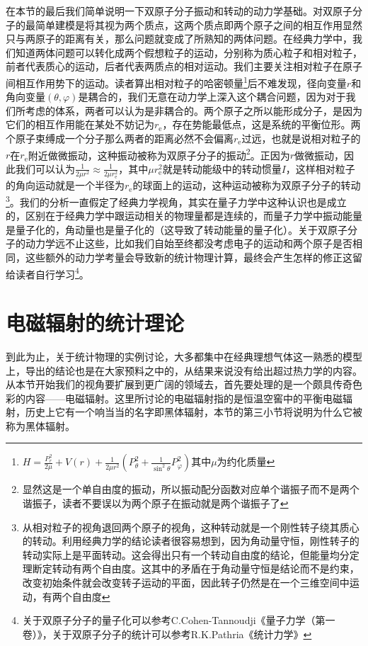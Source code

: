 \documentclass[../../main.tex]{subfiles}
\begin{document}
在本节的最后我们简单说明一下双原子分子振动和转动的动力学基础。对双原子分子的最简单建模是将其视为两个质点，这两个质点即两个原子之间的相互作用显然只与两原子的距离有关，那么问题就变成了所熟知的两体问题。在经典力学中，我们知道两体问题可以转化成两个假想粒子的运动，分别称为质心粒子和相对粒子，前者代表质心的运动，后者代表两质点的相对运动。我们主要关注相对粒子在原子间相互作用势下的运动。读者算出相对粒子的哈密顿量\footnote{\(H=\frac{P_r^2}{2\mu}+V(r)+\frac{1}{2\mu r^2}\left(P_{\theta}^2+\frac{1}{\sin^2\theta}P_{\varphi}^2\right)\)其中\(\mu\)为约化质量}后不难发现，径向变量\(r\)和角向变量\((\theta,\varphi)\)是耦合的，我们无意在动力学上深入这个耦合问题，因为对于我们所考虑的体系，两者可以认为是非耦合的。两个原子之所以能形成分子，是因为它们的相互作用能在某处不妨记为\(r_{\mathrm{e}}\)，存在势能最低点，这是系统的平衡位形。两个原子束缚成一个分子那么两者的距离必然不会偏离\(r_{\mathrm{e}}\)过远，也就是说相对粒子的\(r\)在\(r_{\mathrm{e}}\)附近做微振动，这种振动被称为双原子分子的振动\footnote{显然这是一个单自由度的振动，所以振动配分函数对应单个谐振子而不是两个谐振子，读者不要误以为两个原子在振动就是两个谐振子了}。正因为\(r\)做微振动，因此我们可以认为\(\frac{1}{2\mu r^2}\approx\frac{1}{2\mu r_{\mathrm{e}}^2}\)，其中\(\mu r_{\mathrm{e}}^2\)就是转动能级中的转动惯量\(I\)，这样相对粒子的角向运动就是一个半径为\(r_{\mathrm{e}}\)的球面上的运动，这种运动被称为双原子分子的转动\footnote{从相对粒子的视角退回两个原子的视角，这种转动就是一个刚性转子绕其质心的转动。利用经典力学的结论读者很容易想到，因为角动量守恒，刚性转子的转动实际上是平面转动。这会得出只有一个转动自由度的结论，但能量均分定理断定转动有两个自由度。这其中的矛盾在于角动量守恒是结论而不是约束，改变初始条件就会改变转子运动的平面，因此转子仍然是在一个三维空间中运动，有两个自由度}。我们的分析一直假定了经典力学视角，其实在量子力学中这种认识也是成立的，区别在于经典力学中跟运动相关的物理量都是连续的，而量子力学中振动能量是量子化的，角动量也是量子化的（这导致了转动能量的量子化）。关于双原子分子的动力学远不止这些，比如我们自始至终都没考虑电子的运动和两个原子是否相同，这些额外的动力学考量会导致新的统计物理计算，最终会产生怎样的修正这留给读者自行学习\footnote{关于双原子分子的量子化可以参考C.Cohen-Tannoudji《量子力学（第一卷）》，关于双原子分子的统计可以参考R.K.Pathria《统计力学》}。

\section{电磁辐射的统计理论}\label{sec:电磁辐射的统计理论}

到此为止，关于统计物理的实例讨论，大多都集中在经典理想气体这一熟悉的模型上，导出的结论也是在大家预料之中的，从结果来说没有给出超过热力学的内容。从本节开始我们的视角要扩展到更广阔的领域去，首先要处理的是一个颇具传奇色彩的内容——电磁辐射。这里所讨论的电磁辐射指的是恒温空窖中的平衡电磁辐射，历史上它有一个响当当的名字即黑体辐射，本节的第三小节将说明为什么它被称为黑体辐射。
\end{document}
